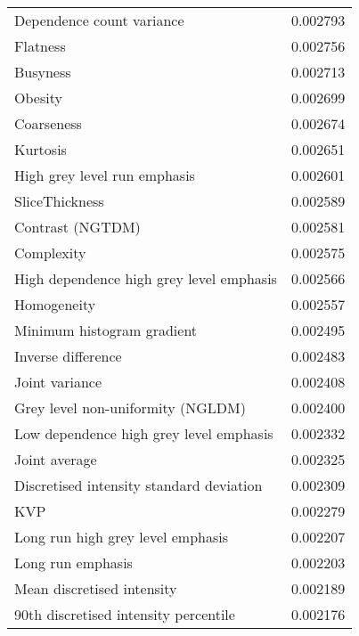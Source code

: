 \begin{longtable}{|lr|}
Dependence count variance                          &        0.002793 \\
Flatness                                           &        0.002756 \\
Busyness                                           &        0.002713 \\
Obesity                                            &        0.002699 \\
Coarseness                                         &        0.002674 \\
Kurtosis                                           &        0.002651 \\
High grey level run emphasis                       &        0.002601 \\
SliceThickness                                     &        0.002589 \\
Contrast (NGTDM)                                   &        0.002581 \\
Complexity                                         &        0.002575 \\
High dependence high grey level emphasis           &        0.002566 \\
Homogeneity                                        &        0.002557 \\
Minimum histogram gradient                         &        0.002495 \\
Inverse difference                                 &        0.002483 \\
Joint variance                                     &        0.002408 \\
Grey level non-uniformity (NGLDM)                  &        0.002400 \\
Low dependence high grey level emphasis            &        0.002332 \\
Joint average                                      &        0.002325 \\
Discretised intensity standard deviation           &        0.002309 \\
KVP                                                &        0.002279 \\
Long run high grey level emphasis                  &        0.002207 \\
Long run emphasis                                  &        0.002203 \\
Mean discretised intensity                         &        0.002189 \\
90th discretised intensity percentile              &        0.002176 \\

\end{longtable}
